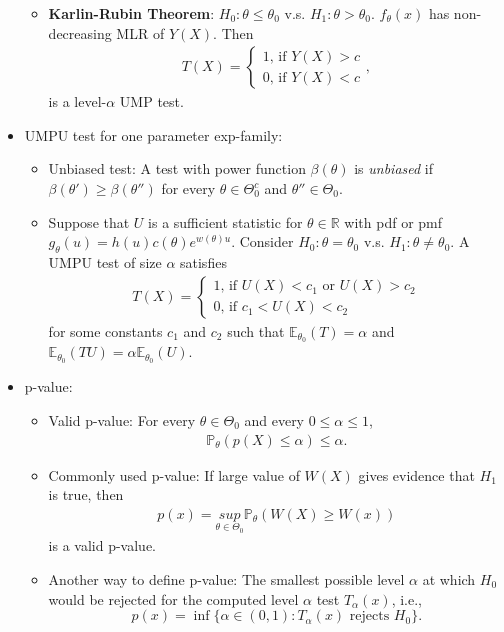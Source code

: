 \documentclass[12pt]{extarticle}
\newcommand{\p}{\mathbb P}
\newcommand{\E}{\mathbb E}
\begin{document}
\begin{itemize}
\begin{itemize}
		\item \textbf{Karlin-Rubin Theorem}: $H_0: \theta \leq \theta_0$ v.s. $H_1: \theta>\theta_0$. $f_\theta(x)$ has non-decreasing MLR of $Y(X)$. Then
		\begin{align*}
		T(X) = \begin{cases}
		1\text{, if } Y(X)>c \\
		0\text{, if } Y(X)<c
		\end{cases},
		\end{align*}
		is a level-$\alpha$ UMP test.
	\end{itemize}
	\item UMPU test for one parameter exp-family:
    \begin{itemize}
        \item Unbiased test: A test with power function $\beta(\theta)$ is \textit{unbiased} if $\beta(\theta')\geq\beta(\theta'')$ for every $\theta\in\Theta_0^c$ and $\theta''\in\Theta_0$.
        \item Suppose that $U$ is a sufficient statistic for $\theta\in\mathbb R$ with pdf or pmf $g_\theta(u) = h(u)c(\theta)e^{w(\theta)u}$.
		Consider $H_0: \theta = \theta_0$ v.s. $H_1: \theta\neq\theta_0$. A UMPU test of size $\alpha$ satisfies 
		\begin{align*}
			T(X) = \begin{cases}
			1\text{, if } U(X) < c_1 \text{ or } U(X) > c_2 \\
			0\text{, if } c_1 < U(X) < c_2
			\end{cases}
			\end{align*}
		for some constants $c_1$ and $c_2$ such that $\E_{\theta_0}(T) = \alpha$ and $\E_{\theta_0}(TU) = \alpha\E_{\theta_0}(U)$.
    \end{itemize}
    \item p-value:
    \begin{itemize}
	\item Valid p-value: For every $\theta \in \Theta_0$ and every $0\leq\alpha\leq 1$, 
	\begin{align*}
	\p_\theta(p(X)\leq\alpha)\leq\alpha.
	\end{align*}
	\item Commonly used p-value: If large value of $W(X)$ gives evidence that $H_1$ is true, then
	\begin{align*}
	p(x)=\underset{\theta\in\Theta_0}{sup}\p_\theta(W(X)\geq W(x))
	\end{align*}
	is a valid p-value.
	\item Another way to define p-value: The smallest possible level $\alpha$ at which $H_0$ would be rejected for the computed level $\alpha$ test $T_\alpha(x)$, i.e.,
	$$p(x) = \inf \{\alpha\in (0, 1): T_\alpha(x) \text{ rejects } H_0\}.$$
    \end{itemize}
\end{itemize}
\end{document}

